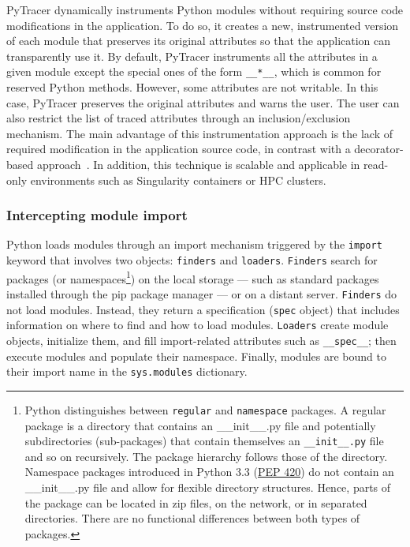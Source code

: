 \documentclass[10pt,journal,compsoc]{IEEEtran}
\newcommand{\pytracer}[0]{PyTracer\xspace}
\begin{document}
\pytracer dynamically instruments Python modules without requiring source code
modifications in the application. To do so, it creates a new, instrumented
version of each module that preserves its original attributes so that the
application can transparently use it.
By default, \pytracer instruments all the attributes in a given module except
the special ones of the form \texttt{\_\_*\_\_}, which is common for reserved
Python methods. However, some attributes are not writable. In this case,
\pytracer preserves the original attributes and warns
the user. The user can also restrict the list of traced attributes through an
inclusion/exclusion mechanism. The main advantage of this instrumentation
approach is the lack of required modification in the application source code, in
contrast with  a decorator-based approach~\mbox{\cite{hunt2019decorators}}. 
In addition, this technique is
scalable and applicable in read-only environments such as Singularity containers
or HPC clusters.

\subsubsection{Intercepting module import}

Python loads modules through an import mechanism triggered by the
\texttt{import} keyword that involves two objects: \texttt{finders} and
\texttt{loaders}. \texttt{Finders} search for packages (or
namespaces\footnote{Python distinguishes between \texttt{regular} and
    \texttt{namespace} packages. A regular package is a directory that contains an
    \_\_init\_\_.py file and potentially subdirectories (sub-packages) that contain
    themselves an \texttt{\_\_init\_\_.py} file and so on recursively. The package
    hierarchy follows those of the directory. Namespace packages introduced in
    Python 3.3 (\href{https://www.python.org/dev/peps/pep-0420/}{PEP 420}) do not
    contain an \_\_init\_\_.py file and allow for flexible directory structures.
    Hence, parts of the package can be located in zip files, on the network, or in
    separated directories. There are no functional differences between both types of
    packages.}) on the local storage --- such as standard packages installed through
the pip package manager --- or on a distant server. \texttt{Finders} do not load
modules. Instead, they return a specification (\texttt{spec} object) that
includes information on where to find and how to load modules. \texttt{Loaders}
create module objects, initialize them, and fill import-related attributes such
as \texttt{\_\_spec\_\_}; then execute modules and populate
their namespace. Finally, modules are bound to their import name in the
\texttt{sys.modules} dictionary.
\end{document}
